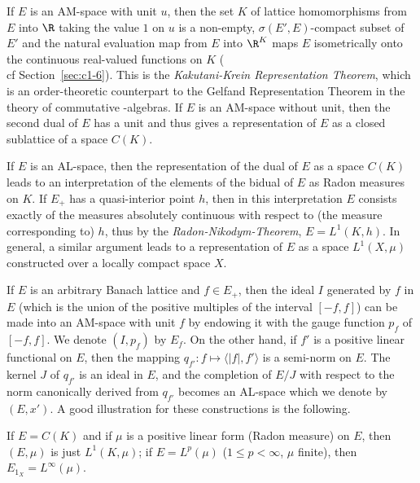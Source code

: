If\/ $ E $ is an AM-space with unit $ u $, then the set $ K $ of lattice homomorphisms from $ E $ into $ \R $ taking the value $ 1 $ on $ u $ is a non-empty, $ \sigma(E',E) $-compact subset of\/ $ E' $ and the natural evaluation map from $ E $ into $ \R^{K} $ maps $ E $ isometrically onto the continuous real-valued functions on $ K $ (\\cf Section~\ref{sec:c1-6}).
This is the \emph{Kakutani-Krein Representation Theorem}, which is an order-theoretic counterpart to the Gelfand Representation Theorem in the theory of commutative \CA-algebras.
If\/ $ E $ is an AM-space without unit, then the second dual of\/ $ E $ has a unit and thus gives a representation of\/ $ E $ as a closed sublattice of a space $ C(K) $.

If\/ $ E $ is an AL-space, then the representation of the dual of\/ $ E $ as a space $ C(K) $ leads to an interpretation of the elements of the bidual of\/ $ E $ as Radon measures on $ K $.
If\/ $ E_{+} $ has a quasi-interior point $ h $, then in this interpretation $ E $ consists exactly of the measures absolutely continuous with respect to (the measure corresponding to) $ h $, thus by the \emph{Radon-Nikodym-Theorem}, $ E = L^{1}(K,h) $.
In general, a similar argument leads to a representation of\/ $ E $ as a space $ L^{1}(X,\mu) $ constructed over a locally compact space $ X $.

If\/ $ E $ is an arbitrary Banach lattice and $ f \in E_{+} $, then the ideal $ I $ generated by $ f $ in $ E $ (which is the union of the positive multiples of the interval $ [-f,f] $) can be made into an AM-space with unit $ f $ by endowing it with the gauge function $ p_{f} $ of\/ $ [-f,f] $.
We denote $ (I,p_{f}) $ by $ E_{f} $.
On the other hand, if\/ $ f' $ is a positive linear functional on $ E $, then the mapping $ q_{f'} \colon f \mapsto \langle |f|,f'\rangle $ is a semi-norm on $ E $.
The kernel $ J $ of\/ $ q_{f'} $ is an ideal in $ E $, and the completion of\/ $ E/J $ with respect to the norm canonically derived from $ q_{f'} $ becomes an AL-space which we denote by $ (E,x') $.
A good illustration for these constructions is the following.

If\/ $ E = C(K) $ and if\/ $ \mu $ is a positive linear form (Radon measure) on $ E $, then $ (E,\mu) $ is just $ L^{1}(K,\mu) $;
if\/ $ E = L^{p}(\mu) $ ($ 1 \leq p < \infty $, $ \mu $ finite), then $ E_{1_{X}} = L^{\infty}(\mu) $.
